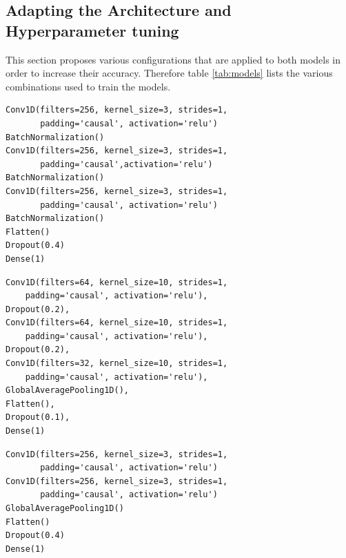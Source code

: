 \subsection{Adapting the Architecture and Hyperparameter tuning}
\label{sec:hyper}
This section proposes various configurations that are applied to both models in order to increase their accuracy. Therefore table \ref{tab:models} lists the various combinations used to train the models.

\newsavebox{\codebox} %
\newsavebox{\codeboxtwo} %
\newsavebox{\codeboxthree} %
\newsavebox{\codeboxfour} %
\newsavebox{\codeboxfive} %

\newsavebox{\codeboxsix} %

\begin{lrbox}{\codeboxsix} %
\begin{lstlisting}[numbers=none, basicstyle=\tiny, numbersep=0pt, xleftmargin=0pt, xrightmargin=0pt, backgroundcolor=\color{white}]
Conv1D(filters=256, kernel_size=3, strides=1, 
	   padding='causal', activation='relu')
BatchNormalization()
Conv1D(filters=256, kernel_size=3, strides=1,
	   padding='causal',activation='relu')
BatchNormalization()
Conv1D(filters=256, kernel_size=3, strides=1, 
	   padding='causal', activation='relu')
BatchNormalization()
Flatten()
Dropout(0.4)
Dense(1)
\end{lstlisting}
\end{lrbox} %



\begin{lrbox}{\codeboxfive} %
\begin{lstlisting}[numbers=none, basicstyle=\tiny, numbersep=0pt, xleftmargin=0pt, xrightmargin=0pt, backgroundcolor=\color{white}]
Conv1D(filters=64, kernel_size=10, strides=1,
    padding='causal', activation='relu'),
Dropout(0.2),
Conv1D(filters=64, kernel_size=10, strides=1,
    padding='causal', activation='relu'),
Dropout(0.2),
Conv1D(filters=32, kernel_size=10, strides=1,
    padding='causal', activation='relu'),
GlobalAveragePooling1D(),
Flatten(),
Dropout(0.1),
Dense(1)
\end{lstlisting}
\end{lrbox} %


\begin{lrbox}{\codeboxfour} %
\begin{lstlisting}[numbers=none, basicstyle=\tiny, numbersep=0pt, xleftmargin=0pt, xrightmargin=0pt, backgroundcolor=\color{white}]
Conv1D(filters=256, kernel_size=3, strides=1,
       padding='causal', activation='relu')
Conv1D(filters=256, kernel_size=3, strides=1,
       padding='causal', activation='relu')
GlobalAveragePooling1D()
Flatten()
Dropout(0.4)
Dense(1)
\end{lstlisting}
\end{lrbox} %

